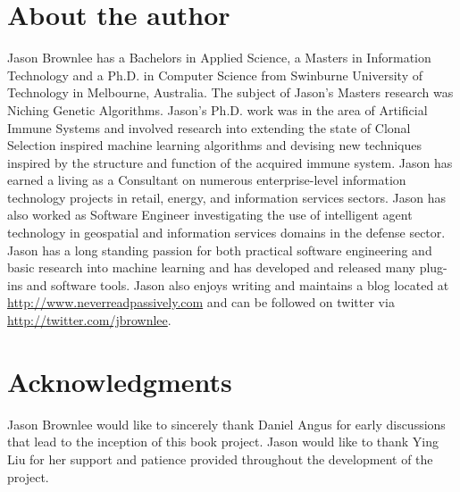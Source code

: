 \section*{About the author}
Jason Brownlee has a Bachelors in Applied Science, a Masters in Information Technology and a Ph.D. in Computer Science from Swinburne University of Technology in Melbourne, Australia. The subject of Jason's Masters research was Niching Genetic Algorithms. Jason's Ph.D. work was in the area of Artificial Immune Systems and involved research into extending the state of Clonal Selection inspired machine learning algorithms and devising new techniques inspired by the structure and function of the acquired immune system.
Jason has earned a living as a Consultant on numerous enterprise-level information technology projects in retail, energy, and information services sectors. Jason has also worked as Software Engineer investigating the use of intelligent agent technology in geospatial and information services domains in the defense sector.
Jason has a long standing passion for both practical software engineering and basic research into machine learning and has developed and released many plug-ins and software tools. Jason also enjoys writing and maintains a blog located at \url{http://www.neverreadpassively.com} and can be followed on twitter via \url{http://twitter.com/jbrownlee}. 

% 
% 
\section*{Acknowledgments}
Jason Brownlee would like to sincerely thank Daniel Angus for early discussions that lead to the inception of this book project.
Jason would like to thank Ying Liu for her support and patience provided throughout the development of the project. 